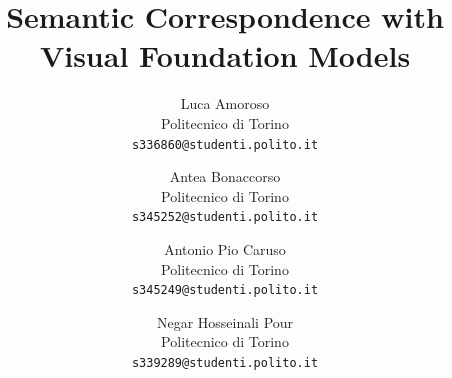 \documentclass[10pt,twocolumn,letterpaper]{article}
\title{Semantic Correspondence with Visual Foundation Models}
\author{Luca Amoroso\\
Politecnico di Torino\\
{\tt\small s336860@studenti.polito.it}
\and
Antea Bonaccorso\\
Politecnico di Torino\\
{\tt\small s345252@studenti.polito.it}
\and
Antonio Pio Caruso\\
Politecnico di Torino\\
{\tt\small s345249@studenti.polito.it}
\and
Negar Hosseinali Pour\\
Politecnico di Torino\\
{\tt\small s339289@studenti.polito.it}
}
\begin{document}
\maketitle
    





% 
{
    \small
    
    
}

% 
\end{document}
